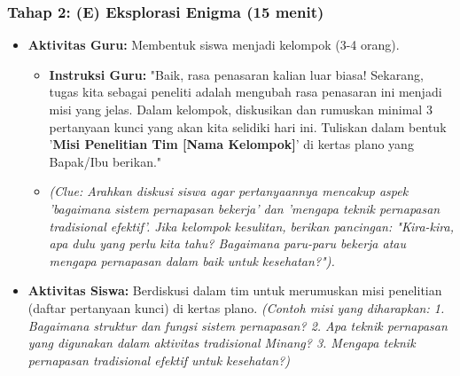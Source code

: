 \documentclass[a4paper,12pt]{article}
\begin{document}
\subsubsection{Tahap 2: (E) Eksplorasi Enigma (15 menit)}
\begin{itemize}
\item \textbf{Aktivitas Guru:} Membentuk siswa menjadi kelompok (3-4 orang).
    \begin{itemize}
    \item \textbf{Instruksi Guru:} "Baik, rasa penasaran kalian luar biasa! Sekarang, tugas kita sebagai peneliti adalah mengubah rasa penasaran ini menjadi misi yang jelas. Dalam kelompok, diskusikan dan rumuskan minimal 3 pertanyaan kunci yang akan kita selidiki hari ini. Tuliskan dalam bentuk '\textbf{Misi Penelitian Tim [Nama Kelompok]}' di kertas plano yang Bapak/Ibu berikan."
    \item \textit{(Clue: Arahkan diskusi siswa agar pertanyaannya mencakup aspek 'bagaimana sistem pernapasan bekerja' dan 'mengapa teknik pernapasan tradisional efektif'. Jika kelompok kesulitan, berikan pancingan: "Kira-kira, apa dulu yang perlu kita tahu? Bagaimana paru-paru bekerja atau mengapa pernapasan dalam baik untuk kesehatan?").}
    \end{itemize}
\item \textbf{Aktivitas Siswa:} Berdiskusi dalam tim untuk merumuskan misi penelitian (daftar pertanyaan kunci) di kertas plano. \textit{(Contoh misi yang diharapkan: 1. Bagaimana struktur dan fungsi sistem pernapasan? 2. Apa teknik pernapasan yang digunakan dalam aktivitas tradisional Minang? 3. Mengapa teknik pernapasan tradisional efektif untuk kesehatan?)}
\end{itemize}
\end{document}
